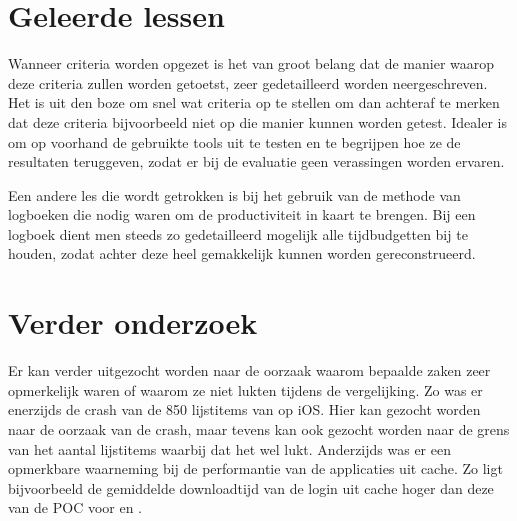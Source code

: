 \section{Geleerde lessen} %
Wanneer criteria worden opgezet is het van groot belang dat de manier waarop deze criteria zullen worden getoetst, zeer gedetailleerd worden neergeschreven.
Het is uit den boze om snel wat criteria op te stellen om dan achteraf te merken dat deze criteria bijvoorbeeld niet op die manier kunnen worden getest.
Idealer is om op voorhand de gebruikte tools uit te testen en te begrijpen hoe ze de resultaten teruggeven, zodat er bij de evaluatie geen verassingen worden ervaren.

Een andere les die wordt getrokken is bij het gebruik van de methode van logboeken die nodig waren om de productiviteit in kaart te brengen.
Bij een logboek dient men steeds zo gedetailleerd mogelijk alle tijdbudgetten bij te houden, zodat achter deze heel gemakkelijk kunnen worden gereconstrueerd.



\section{Verder onderzoek} %
Er kan verder uitgezocht worden naar de oorzaak waarom bepaalde zaken zeer opmerkelijk waren of waarom ze niet lukten tijdens de vergelijking.
Zo was er enerzijds de crash van de 850 lijstitems van \kendo{} op iOS.
Hier kan gezocht worden naar de oorzaak van de crash, maar tevens kan ook gezocht worden naar de grens van het aantal lijstitems waarbij dat het wel lukt.
Anderzijds was er een opmerkbare waarneming bij de performantie van de applicaties uit cache. 
Zo ligt bijvoorbeeld de gemiddelde downloadtijd van de login uit cache hoger dan deze van de POC voor \jqm{} en \lungo{}. 

